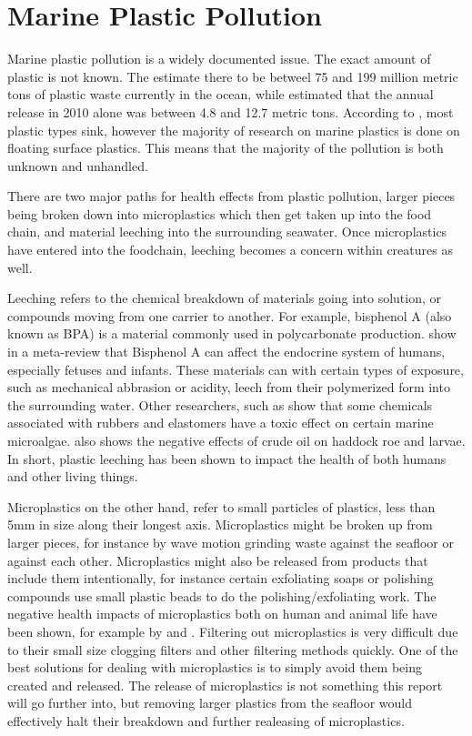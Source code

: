 \documentclass[class=article, crop=false]{standalone}
\begin{document}
\section{Marine Plastic Pollution}
Marine plastic pollution is a widely documented issue. The exact amount of plastic is not known. The \citet{world_economic_forum_top_2022} estimate there to be betweel 75 and 199 million metric tons of plastic waste currently in the ocean, while \citet{jambeck_plastic_2015} estimated that the annual release in 2010 alone was between 4.8 and 12.7 metric tons. According to \citet{isobe_fate_2022}, most plastic types sink, however the majority of research on marine plastics is done on floating surface plastics. This means that the majority of the pollution is both unknown and unhandled.

There are two major paths for health effects from plastic pollution, larger pieces being broken down into microplastics which then get taken up into the food chain, and material leeching into the surrounding seawater. Once microplastics have entered into the foodchain, leeching becomes a concern within creatures as well.

Leeching refers to the chemical breakdown of materials going into solution, or compounds moving from one carrier to another. For example, bisphenol A (also known as BPA) is a material commonly used in polycarbonate production. \citet{rochester_bisphenol_2013} show in a meta-review that Bisphenol A can affect the endocrine system of humans, especially fetuses and infants. These materials can with certain types of exposure, such as mechanical abbrasion or acidity, leech from their polymerized form into the surrounding water. Other researchers, such as \citet{sorensen_organic_2023} show that some chemicals associated with rubbers and elastomers have a toxic effect on certain marine microalgae. \citet{sorhus_crude_2023} also shows the negative effects of crude oil on haddock roe and larvae. In short, plastic leeching has been shown to impact the health of both humans and other living things.

Microplastics on the other hand, refer to small particles of plastics, less than 5mm in size along their longest axis. Microplastics might be broken up from larger pieces, for instance by wave motion grinding waste against the seafloor or against each other. Microplastics might also be released from products that include them intentionally, for instance certain exfoliating soaps or polishing compounds use small plastic beads to do the polishing/exfoliating work. The negative health impacts of microplastics both on human and animal life have been shown, for example by \citet{segovia-mendoza_how_2020} and \citet{zolotova_harmful_2022}. Filtering out microplastics is very difficult due to their small size clogging filters and other filtering methods quickly. One of the best solutions for dealing with microplastics is to simply avoid them being created and released. The release of microplastics is not something this report will go further into, but removing larger plastics from the seafloor would effectively halt their breakdown and further realeasing of microplastics.
\end{document}

